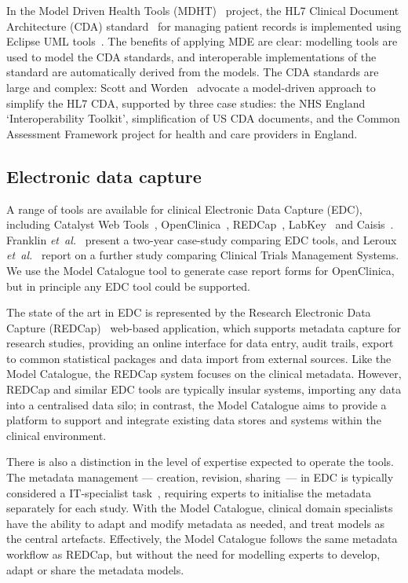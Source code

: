 \documentclass[a4paper,twoside]{article}
\begin{document}
In the Model Driven Health Tools (MDHT)~\cite{MDHT} project, the HL7
Clinical Document Architecture (CDA) standard~\cite{doli06} for
managing patient records is implemented using Eclipse UML
tools~\cite{EUML}. The benefits of applying MDE
are clear: modelling tools are used to model the CDA standards, and
interoperable implementations of the standard are automatically
derived from the models.  The CDA standards are large and complex: 
Scott and Worden~\cite{sco12} advocate a
model-driven approach to simplify the HL7 CDA,
supported by three case studies: the NHS England `Interoperability
Toolkit', simplification of US CDA documents, and the Common
Assessment Framework project for health and care providers in
England. 

\subsection{Electronic data capture}

A range of tools are available for clinical Electronic Data Capture
(EDC), including Catalyst Web Tools~\cite{catalyst},
OpenClinica~\cite{oc}, REDCap~\cite{harr09}, LabKey~\cite{labk} and
Caisis~\cite{cais}. Franklin \textit{et~al.}~\cite{fran11} present
a two-year case-study comparing EDC tools, 
and Leroux \textit{et~al.}~\cite{lero11} report on
a further study comparing Clinical Trials Management Systems. 
We use the Model Catalogue tool to generate
case report forms for OpenClinica, but in principle any EDC tool could be
supported. 

The state of the art in EDC is represented by the Research Electronic Data
Capture (REDCap)~\cite{harr09} web-based application, which
supports metadata capture for research studies, providing an online
interface for data entry, audit trails, export to common statistical
packages and data import from external sources. Like the Model
Catalogue, the REDCap system focuses on the clinical
metadata. However, REDCap and similar EDC tools are typically 
insular systems, importing any data into a centralised data silo;
in contrast, the Model
Catalogue aims to provide a platform to support and integrate 
existing data stores
and systems within the clinical environment.

There is also a distinction in the level of expertise expected to operate
the tools. The metadata management --- creation, revision, sharing~--- in
EDC is typically considered a IT-specialist task~\cite{harr09,fran11}, requiring
experts to initialise the metadata separately for each study. With the Model
Catalogue, clinical domain specialists have the ability to adapt and modify
metadata as needed, and treat models as the central
artefacts. Effectively, the Model Catalogue follows the same metadata
workflow as REDCap, but without the need for modelling experts to
develop, adapt or share the metadata models. 
\end{document}
